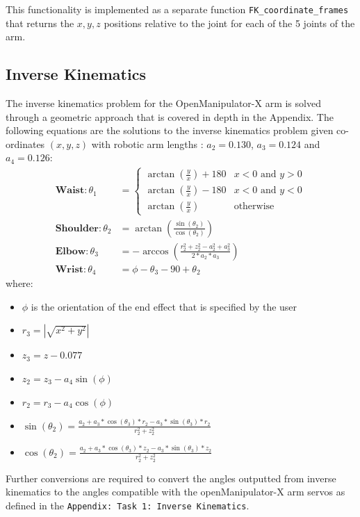 \documentclass[9pt, a4paper]{article}
\begin{document}
This functionality is implemented as a separate function
\verb+FK_coordinate_frames+ that returns the
$x,y,z$ positions relative to the joint for each of the 5 joints of the arm.

\subsection{Inverse Kinematics}
The inverse kinematics problem for the OpenManipulator-X arm is solved through a
geometric approach that is covered in depth in the Appendix. The following
equations are the solutions to the inverse kinematics problem given co-ordinates
$(x, y, z)$ with robotic arm lengths \cite{CAD_model}: $a_2 = 0.130$, $a_3 = 0.124$ and $a_4 = 0.126$:
\begin{align*}
    \textbf{Waist}: \theta_1 &= \begin{cases} 
        \arctan(\frac{y}{x}) + 180 & x < 0 \text{ and } y > 0 \\ 
        \arctan(\frac{y}{x}) - 180 & x < 0 \text{ and } y < 0 \\
        \arctan(\frac{y}{x}) & \text{otherwise}
    \end{cases} \\
    \textbf{Shoulder}: \theta_2 &= \arctan\left(\frac{\sin(\theta_2)}{\cos(\theta_2)}\right) \\ 
    \textbf{Elbow}: \theta_3 &= -\arccos\left(\frac{r_2^2 + z_2^2 - a_2^2 + a_3^2}{2*a_2*a_3}\right)\\ 
    \textbf{Wrist}: \theta_4 &= \phi - \theta_3 - 90 + \theta_2 
\end{align*}
where:
\begin{itemize}
    \item $\phi$ is the orientation of the end effect that is specified by the user
    \item $r_3 = |\sqrt{x^2 + y^2}|$
    \item $z_3 = z - 0.077$
    \item $z_2 = z_3 - a_4\sin(\phi)$  
    \item $r_2 = r_3 - a_4\cos(\phi)$
    \item $\sin(\theta_2) = \frac{a_2 + a_3*\cos(\theta_3)*r_2 - a_3*\sin(\theta_3)*r_2}{r_2^2 + z_2^2}$
    \item $\cos(\theta_2) = \frac{a_2 + a_3*\cos(\theta_3)*z_2 - a_3*\sin(\theta_3)*z_2}{r_2^2 + z_2^2}$
\end{itemize}

Further conversions are required to convert the angles outputted from inverse
kinematics to the angles compatible with the openManipulator-X arm servos as
defined in the \verb+Appendix: Task 1: Inverse Kinematics+.
\end{document}
